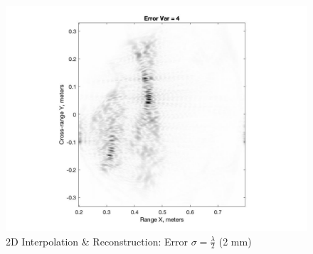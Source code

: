 \documentclass{article}
\begin{document}
\begin{figure}[h!]
    \centering
    \includegraphics[width=.6\linewidth]{Figures/2dvar4.jpg}
    \caption{2D Interpolation \& Reconstruction: Error $\sigma=\frac{\lambda}{2}$ (2 mm)}
    \label{2dvar4}
\end{figure}
\end{document}

